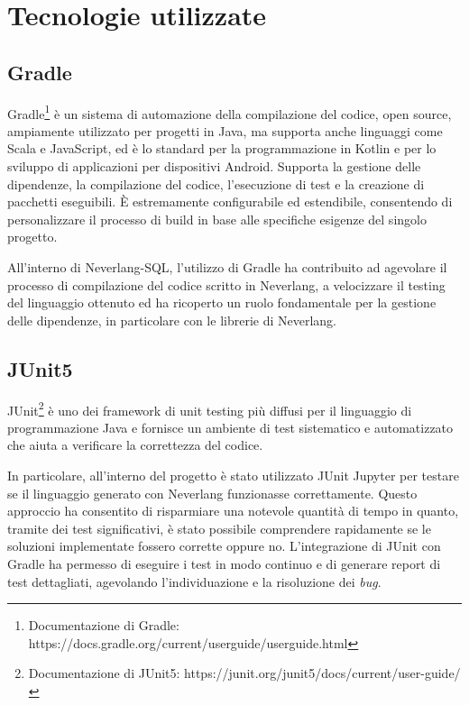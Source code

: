 \documentclass[12pt,a4paper,openright,twoside]{book}
\begin{document}


\section{Tecnologie utilizzate}

\subsection{Gradle}
Gradle\footnote{Documentazione di Gradle: https://docs.gradle.org/current/userguide/userguide.html} è un sistema di automazione della 
compilazione del codice, open source, ampiamente utilizzato per progetti in Java, ma supporta anche linguaggi come Scala e JavaScript, ed è 
lo standard per la programmazione in Kotlin e per lo sviluppo di applicazioni per dispositivi Android. Supporta la gestione delle dipendenze, 
la compilazione del codice, l’esecuzione di test e la creazione di pacchetti eseguibili. È estremamente configurabile ed estendibile, 
consentendo di personalizzare il processo di build in base alle specifiche esigenze del singolo progetto.

All’interno di Neverlang-SQL, l’utilizzo di Gradle ha contribuito ad agevolare il processo di compilazione del codice scritto in Neverlang, a 
velocizzare il testing del linguaggio ottenuto ed ha ricoperto un ruolo fondamentale per la gestione delle dipendenze, in particolare con le 
librerie di Neverlang.

\subsection{JUnit5}
JUnit\footnote{Documentazione di JUnit5: https://junit.org/junit5/docs/current/user-guide/} è uno dei framework di unit testing più diffusi 
per il linguaggio di programmazione Java e fornisce un ambiente di test sistematico e automatizzato che aiuta a verificare la correttezza del 
codice.

In particolare, all’interno del progetto è stato utilizzato JUnit Jupyter per testare se il linguaggio generato con Neverlang funzionasse 
correttamente. Questo approccio ha consentito di risparmiare una notevole quantità di tempo in quanto, tramite dei test significativi, è stato 
possibile comprendere rapidamente se le soluzioni implementate fossero corrette oppure no. L’integrazione di JUnit con Gradle ha permesso di 
eseguire i test in modo continuo e di generare report di test dettagliati, agevolando l’individuazione e la risoluzione dei \textit{bug}.
\end{document}
